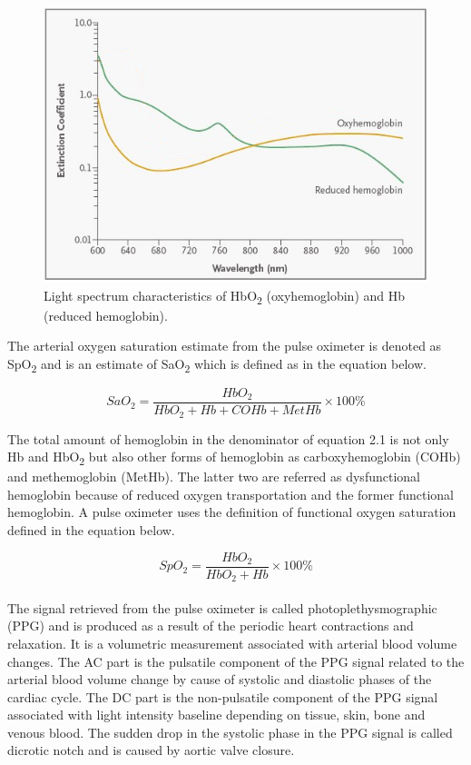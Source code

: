 \documentclass{report}
\begin{document}
\begin{figure}[H]
\centering
  \includegraphics[width=.55\linewidth]{hemoglobin}
  \caption{Light spectrum characteristics of HbO\textsubscript{2} (oxyhemoglobin) and Hb (reduced hemoglobin).}
\end{figure}

\noindent
The arterial oxygen saturation estimate from the pulse oximeter is denoted as SpO\textsubscript{2} and is an estimate of SaO\textsubscript{2} which is defined as in the equation below.

\begin{equation}
SaO_{2} = \frac{HbO_{2}}{HbO_{2} + Hb + COHb + MetHb} \times 100 \%
\end{equation}

\noindent
The total amount of hemoglobin in the denominator of equation 2.1 is not only Hb and HbO\textsubscript{2} but also other forms of hemoglobin as carboxyhemoglobin (COHb) and methemoglobin (MetHb). The latter two are referred as dysfunctional hemoglobin because of reduced oxygen transportation and the former functional hemoglobin. A pulse oximeter uses the definition of functional oxygen saturation defined in the equation below.

\begin{equation}
SpO_{2} = \frac{HbO_{2}}{HbO_{2} + Hb} \times 100 \%
\end{equation}
\noindent
\\
The signal retrieved from the pulse oximeter is called photoplethysmographic (PPG) and is produced as a result of the periodic heart contractions and relaxation. It is a volumetric measurement associated with arterial blood volume changes. The AC part is the pulsatile component of the PPG signal related to the arterial blood volume change by cause of systolic and diastolic phases of the cardiac cycle. The DC part is the non-pulsatile component of the PPG signal associated with light intensity baseline depending on tissue, skin, bone and venous blood. The sudden drop in the systolic phase in the PPG signal is called dicrotic notch and is caused by aortic valve closure.
\end{document}
